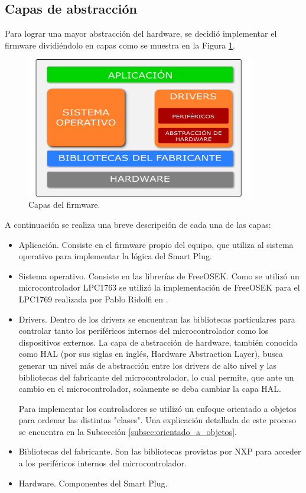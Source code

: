 \subsection{Capas de abstracción}

Para lograr una mayor abstracción del hardware, se decidió implementar el firmware dividiéndolo en capas como se muestra en la Figura \ref{fig:firmware_diagrama_capas}.

\begin{figure}[h]
	\centering
	\includegraphics[width=10cm]{./Figures/3_2_2_firmware_diagrama_capas.png}
	\caption{Capas del firmware.}
	\label{fig:firmware_diagrama_capas}
\end{figure}

A continuación se realiza una breve descripción de cada una de las capas:

\begin{itemize}
\item Aplicación. Consiste en el firmware propio del equipo, que utiliza al sistema operativo para implementar la lógica del Smart Plug.
\item Sistema operativo. Consiste en las librerías de FreeOSEK. Como se utilizó un microcontrolador LPC1763 se utilizó la implementación de FreeOSEK para el LPC1769 realizada por Pablo Ridolfi en \citep{repo_ridolfi_freeosek}.
\item Drivers. Dentro de los drivers se encuentran las bibliotecas particulares para controlar tanto los periféricos internos del microcontrolador como los dispositivos externos. La capa de abstracción de hardware, también conocida como HAL (por sus siglas en inglés, Hardware Abstraction Layer), busca generar un nivel más de abstracción entre los drivers de alto nivel y las bibliotecas del fabricante del microcontrolador, lo cual permite, que ante un cambio en el microcontrolador, solamente se deba cambiar la capa HAL.

Para implementar los controladores se utilizó un enfoque orientado a objetos para ordenar las distintas "clases". Una explicación detallada de este proceso se encuentra en la Subsección \ref{subsec:orientado_a_objetos}.
\item Bibliotecas del fabricante. Son las bibliotecas provistas por NXP para acceder a los periféricos internos del microcontrolador.
\item Hardware. Componentes del Smart Plug.
\end{itemize}

